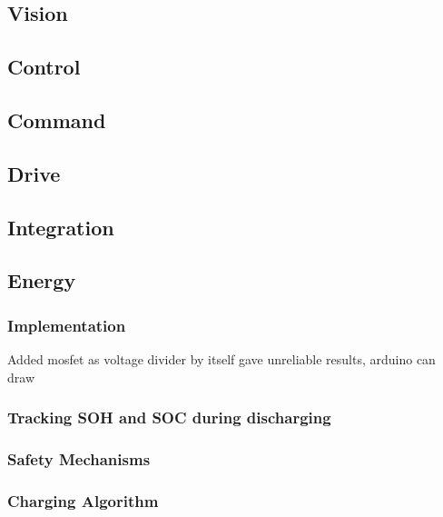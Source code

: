 \documentclass[a4paper]{article}
\begin{document}
\subsection{Vision}

\subsection{Control}

\subsection{Command}

\subsection{Drive}

\subsection{Integration}


\subsection{Energy}

\subsubsection{Implementation}
Added mosfet as voltage divider by itself gave unreliable results, arduino can draw

\subsubsection{Tracking SOH and SOC during discharging}

\subsubsection{Safety Mechanisms}

\subsubsection{Charging Algorithm}



\end{document}
